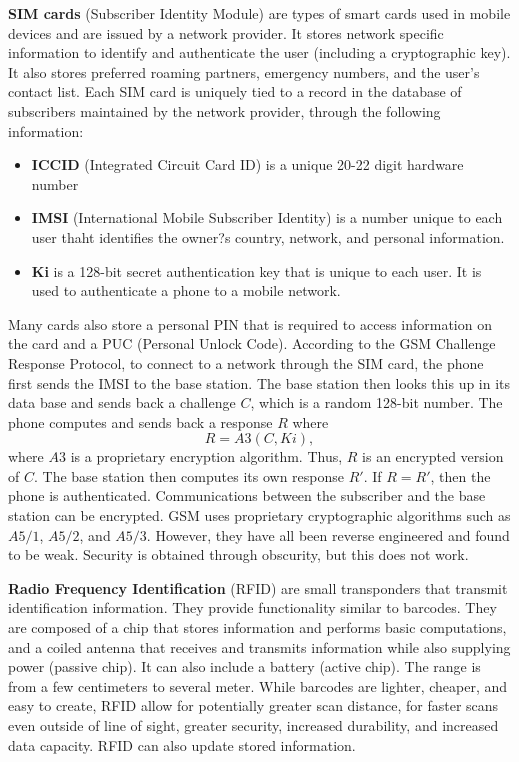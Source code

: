 \documentclass[11pt]{article}
\theoremstyle{plain} %
\theoremstyle{definition}
\theoremstyle{example}
\theoremstyle{remark}
\begin{document}
\textbf{SIM cards} (Subscriber Identity Module) are types of smart cards used in mobile devices and are issued by a network provider. It stores network specific information to identify and authenticate the user (including a cryptographic key). It also stores preferred roaming partners, emergency numbers, and the user's contact list. Each SIM card is uniquely tied to a record in the database of subscribers maintained by the network provider, through the following information:
\begin{itemize}
	\item \textbf{ICCID} (Integrated Circuit Card ID) is a unique 20-22 digit hardware number
	\item \textbf{IMSI} (International Mobile Subscriber Identity) is a number unique to each user thaht identifies the owner?s country, network, and personal information.
	\item \textbf{Ki } is a 128-bit secret authentication key that is unique to each user. It is used to authenticate a phone to a mobile network.
\end{itemize}
Many cards also store a personal PIN that is required to access information on the card and a PUC (Personal Unlock Code). According to the GSM Challenge Response Protocol, to connect to a network through the SIM card, the phone first sends the IMSI to the base station. The base station then looks this up in its data base and sends back a challenge $C$, which is a random 128-bit number. The phone computes and sends back a response $R$ where 
$$R = A3(C, Ki),$$
where $A3$ is a proprietary encryption algorithm. Thus, $R$ is an encrypted version of $C$. The base station then computes its own response $R'$. If $R = R'$, then the phone is authenticated. Communications between the subscriber and the base station can be encrypted. GSM uses proprietary cryptographic algorithms such as $A5/1$, $A5/2$, and $A5/3$. However, they have all been reverse engineered and found to be weak. Security is obtained through obscurity, but this does not work. 

\textbf{Radio Frequency Identification} (RFID) are small transponders that transmit identification information. They provide functionality similar to barcodes. They are composed of a chip that stores information and performs basic computations, and a coiled antenna that receives and transmits information while also supplying power (passive chip). It can also include a battery (active chip). The range is from a few centimeters to several meter. While barcodes are lighter, cheaper, and easy to create, RFID allow for potentially greater scan distance, for faster scans even outside of line of sight, greater security, increased durability, and increased data capacity. RFID can also update stored information. 
\end{document}
